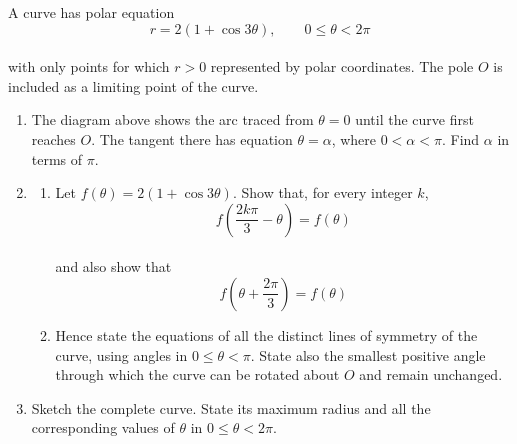 \documentclass[leqno]{article}
\begin{document}
\begin{enumerate}[
  label=\textbf{\arabic*.},
  leftmargin=*,
  topsep=0pt,
  partopsep=0pt,
  parsep=0pt
]
\newpage

\questionitem

\begin{figure}[H]
    \centering
{}
\end{figure}


A curve has polar equation
\[
r=2(1+\cos 3\theta),\qquad 0\leq\theta<2\pi
\] \\
with only points for which $r>0$ represented by polar coordinates. The pole $O$ is included as a limiting point of the curve. \\
\begin{enumerate}[label=\textbf{(\roman*)}]
\item The diagram above shows the arc traced from $\theta=0$ until the curve first reaches $O$. The tangent there has equation $\theta=\alpha$, where $0<\alpha<\pi$. Find $\alpha$ in terms of $\pi$.  \\
\item
\begin{enumerate}[label=(\alph*)]
\item Let $f(\theta)=2(1+\cos 3\theta)$. Show that, for every integer $k$,
\[
f\left(\frac{2k\pi}{3}-\theta\right)=f(\theta)
\] \\
and also show that
\[
f\left(\theta+\frac{2\pi}{3}\right)=f(\theta)
\] 
\item Hence state the equations of all the distinct lines of symmetry of the curve, using angles in $0\leq\theta<\pi$. State also the smallest positive angle through which the curve can be rotated about $O$ and remain unchanged.  \\
\end{enumerate}
\item Sketch the complete curve. State its maximum radius and all the corresponding values of $\theta$ in $0\leq\theta<2\pi$.  \\
\end{enumerate}


\end{enumerate}
\end{document}
